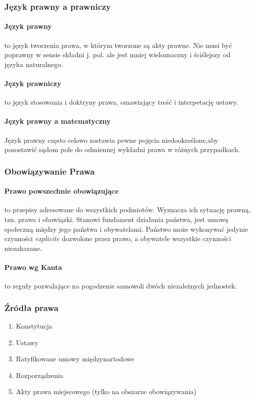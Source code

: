 \message{ !name(owi.tex)}\documentclass{article}
\begin{document}
\subsubsection{Język prawny a prawniczy}

\paragraph{Język prawny} to język tworzenia prawa, w którym tworzone są akty prawne.
Nie musi być poprawny w sensie składni j. pol. ale jest mniej wieloznaczny i ściślejszy
od języka naturalnego.

\paragraph{Język prawniczy} to język stosowania i doktryny prawa, omawiający treść
i interpetację ustawy.

\paragraph{Język prawny a matematyczny}
Język prawny często celowo zostawia pewne pojęcia niedookreślone,aby pozostawić
sądom pole do odmiennej wykładni prawa w różnych przypadkach.

\subsubsection{Obowiązywanie Prawa}

\paragraph{Prawo powszechnie obowiązujące} to przepisy adresowane do wszystkich podmiotów.
Wyznacza ich sytuację prawną, tzn. prawa i obowiązki.
Stanowi fundament działania państwa,
jest umową społeczną między jego państwa i obywatelami.
Państwo może wykonywać jedynie czynności \textit{explicite} dozwolone przez prawo,
a obywatele wszystkie czynności niezakazane.

\paragraph{Prawo wg Kanta}
to reguły pozwalające na pogodzenie samowoli dwóch niezależnych jednostek.

\subsubsection{Źródła prawa}
\begin{enumerate}
  \item Konstytucja
  \item Ustawy
  \item Ratyfikowane umowy międzynartodowe
  \item Rozporządzenia
  \item Akty prawa miejscowego (tylko na obszarze obowiązywania)
\end{enumerate}
\end{document}
